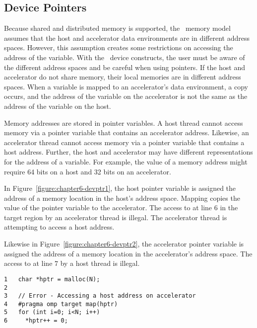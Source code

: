 \subsection{Device Pointers}
\label{ssec:06.device-pointers}

Because shared and distributed memory is supported, the \OMP\ memory model
assumes that the host and accelerator data environments are in different
address spaces.  However, this assumption creates some restrictions on
accessing the address of the variable.
With the \OMP\ device constructs, the user must be aware of the different
address spaces and be careful when using pointers.  
If the host and accelerator do not share memory, their local memories are in
different address spaces.  When a variable is mapped to an accelerator's data
environment, a copy occurs, and the address of the variable on the accelerator
is not the same as the address of the variable on the host.

Memory addresses are stored in pointer variables.  A host thread cannot access
memory via a pointer variable that contains an accelerator address.  Likewise,
an accelerator thread cannot access memory via a pointer variable that contains
a host address.  
Further, the host and accelerator may have different representations for the
address of a variable.  For example, the value of a memory address might
require 64 bits on a host and 32 bits on an accelerator.

In Figure~\ref{figure:chapter6-devptr1}, the host pointer variable  is
assigned the address of a memory location in the host's address space.  
Mapping  copies the value of the pointer variable to the accelerator. The
access to  at line $6$ in the target region by an accelerator thread is illegal.
The accelerator thread is attempting to access a host address.

Likewise in Figure~\ref{figure:chapter6-devptr2}, the accelerator pointer
variable  is assigned the address of a memory location in the
accelerator's address space.  The access to  at line $7$ by a host thread is illegal.

\begin{figure*}[!tb]
\begin{verbatim}
1   char *hptr = malloc(N);
2
3   // Error - Accessing a host address on accelerator
4   #pragma omp target map(hptr)
5   for (int i=0; i<N; i++)
6     *hptr++ = 0;
\end{verbatim}
\caption{ \textbf {Illegal access of a host memory address } -- \small
          A pointer variable containing a host memory address cannot be
          de-referenced by an accelerator thread.
         }
\label{figure:chapter6-devptr1}
\end{figure*}


